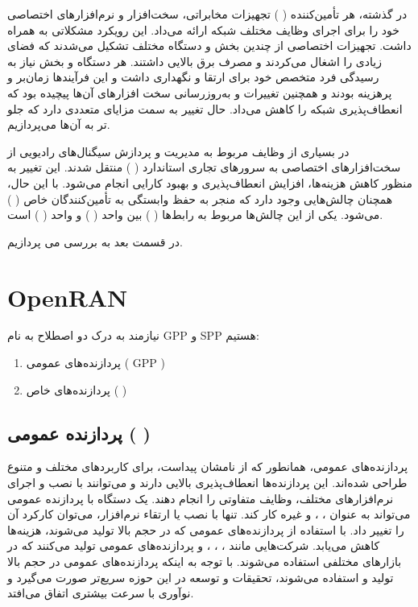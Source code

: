 \documentclass[landscape, 12pt]{report}
\begin{document}
در گذشته، هر تأمین‌کننده (
) تجهیزات مخابراتی، سخت‌افزار و نرم‌افزارهای اختصاصی خود را برای اجرای وظایف مختلف شبکه ارائه می‌داد. این رویکرد مشکلاتی به همراه داشت. تجهیزات اختصاصی از چندین بخش و دستگاه مختلف تشکیل می‌شدند که فضای زیادی را اشغال می‌کردند و مصرف برق بالایی داشتند. هر دستگاه و بخش نیاز به رسیدگی فرد متخصص خود برای ارتقا و نگهداری داشت و این فرآیندها زمان‌بر و پرهزینه بودند و همچنین تغییرات و به‌روزرسانی سخت افزارهای‌ آن‌ها پیچیده بود که انعطاف‌پذیری شبکه را کاهش می‌داد. حال تغییر به سمت
 مزایای متعددی دارد که جلو تر به آن‌ها می‌پردازیم.

در
  بسیاری از وظایف مربوط به مدیریت و پردازش سیگنال‌های رادیویی از سخت‌افزارهای اختصاصی به سرورهای تجاری استاندارد (
  ) منتقل شدند. این تغییر به منظور کاهش هزینه‌ها، افزایش انعطاف‌پذیری و بهبود کارایی انجام می‌شود. با این حال، همچنان چالش‌هایی وجود دارد که منجر به حفظ وابستگی به تأمین‌کنندگان خاص (
  ) می‌شود. یکی از این چالش‌ها مربوط به رابط‌ها (
  ) بین واحد  (
  ) و واحد (
  )  است.
  
  
  در قسمت بعد به بررسی 
  می پردازیم.
  
  \chapter*{OpenRAN}
  نیازمند به درک دو اصطلاح به نام
   GPP
    و
     SPP
      هستیم:
 \begin{enumerate}
 	\item پردازنده‌های عمومی (
 	{GPP}
 	)
 	\item پردازنده‌های خاص (
 	)
 \end{enumerate}
 	\section*{پردازنده عمومی (
 		)}
 		
 	پردازنده‌های عمومی، همانطور که از نامشان پیداست، برای کاربردهای مختلف و متنوع طراحی شده‌اند. این پردازنده‌ها انعطاف‌پذیری بالایی دارند و می‌توانند با نصب و اجرای نرم‌افزارهای مختلف، وظایف متفاوتی را انجام دهند. یک دستگاه با پردازنده عمومی می‌تواند به عنوان
 	 ،
 	  ،
 	    و غیره کار کند. تنها با نصب یا ارتقاء نرم‌افزار، می‌توان کارکرد آن را تغییر داد. با استفاده از پردازنده‌های عمومی که در حجم بالا تولید می‌شوند، هزینه‌ها کاهش می‌یابد. شرکت‌هایی مانند
 	     ،
 	      ،
 	       ،
 	        و
 	         پردازنده‌های عمومی تولید می‌کنند که در بازارهای مختلفی استفاده می‌شوند. با توجه به اینکه پردازنده‌های عمومی در حجم بالا تولید و استفاده می‌شوند، تحقیقات و توسعه در این حوزه سریع‌تر صورت می‌گیرد و نوآوری با سرعت بیشتری اتفاق می‌افتد.
 	         
\end{document}
